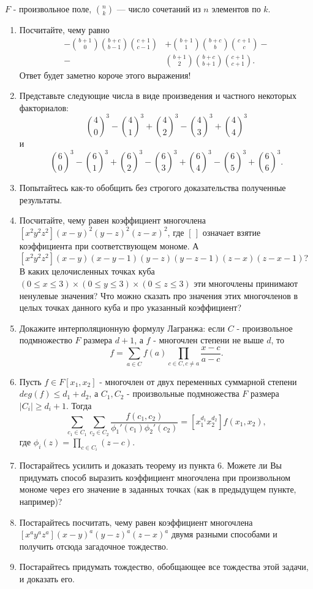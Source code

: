 $F$ - произвольное поле, $n\choose k$ --- число сочетаний из $n$ элементов по $k$.
\begin{enumerate}
\item  Посчитайте, чему равно
\begin{align*}
-{b + 1 \choose 0}{b + c \choose b - 1}{c + 1 \choose c - 1} & + {b + 1 \choose 1}{b + c \choose b}{c + 1 \choose c} -\\
 - & {b + 1 \choose 2}{b + c \choose b + 1}{c + 1 \choose c + 1}.
\end{align*}
Ответ будет заметно короче этого выражения!

\item Представьте следующие числа в виде произведения и частного некоторых факториалов: $${4 \choose 0}^3 - {4 \choose 1}^3 + {4 \choose 2}^3 - {4 \choose 3}^3 + {4 \choose 4}^3$$ и $${6 \choose 0}^3 - {6 \choose 1}^3 + {6 \choose 2}^3 - {6 \choose 3}^3 + {6 \choose 4}^3 - {6 \choose 5}^3 + {6 \choose 6}^3.$$

\item Попытайтесь как-то обобщить без строгого доказательства полученные результаты.

\item Посчитайте, чему равен коэффициент многочлена $[x^2y^2z^2](x-y)^2(y-z)^2(z-x)^2$, где $[\,]$ означает взятие коэффициента при соответствующем мономе. А $[x^2y^2z^2](x-y)(x-y-1)(y-z)(y-z-1)(z-x)(z-x-1)$? В каких целочисленных точках куба $(0 \leq x \leq 3) \times (0 \leq y \leq 3) \times (0 \leq z \leq 3)$ эти многочлены принимают ненулевые значения? Что можно сказать про значения этих многочленов в целых точках данного куба и про указанный коэффициент?

\item Докажите интерполяционную формулу Лагранжа: если $C$ - произвольное подмножество $F$ размера $d + 1$, а $f$ - многочлен степени не выше $d$, то $$f = \sum\limits_{a \in C}{f(a){\prod_{c \in C, c \neq a}\frac{x - c}{a - c}}}.$$

\item Пусть $f \in F[x_1,x_2]$ - многочлен от двух переменных суммарной степени $deg(f) \leq d_1 + d_2$, а $C_1,C_2$ - произвольные подмножества $F$ размера $|C_i| \geq d_i + 1$. Тогда $$\sum\limits_{c_1 \in C_1} \sum\limits_{c_2 \in C_2} \frac{f(c_1,c_2)}{\phi_1'(c_1)\phi_2'(c_2)} = [x_1^{d_1}x_2^{d_2}]f(x_1,x_2),$$ где $\phi_i(z) = \prod_{c\in C_i}{(z-c)}$.

\item Постарайтесь усилить и доказать теорему из пункта 6. Можете ли Вы придумать способ выразить коэффициент многочлена при произвольном мономе через его значение в заданных точках (как в предыдущем пункте, например)?

\item Постарайтесь посчитать, чему равен коэффициент многочлена $[x^ay^az^a](x-y)^a(y-z)^a(z-x)^a$ двумя разными способами и получить отсюда загадочное тождество.

\item Постарайтесь придумать тождество, обобщающее все тождества этой задачи, и доказать его. 



\end{enumerate}



